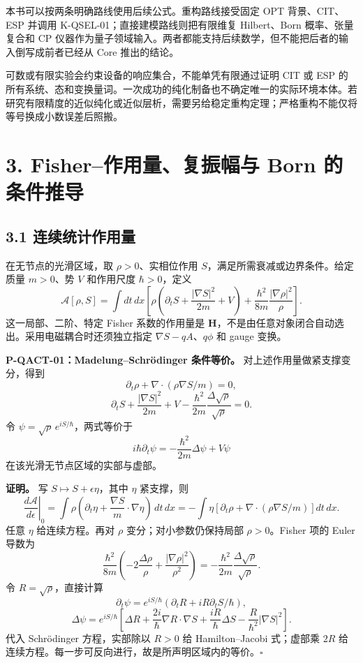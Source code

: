 \documentclass[
  11pt,
  oneside]{book}
\begin{document}
本书可以按两条明确路线使用后续公式。重构路线接受固定 OPT 背景、CIT、ESP
并调用 K-QSEL-01；直接建模路线则把有限维复 Hilbert、Born
概率、张量复合和 CP
仪器作为量子领域输入。两者都能支持后续数学，但不能把后者的输入倒写成前者已经从
Core 推出的结论。

可数或有限实验会约束设备的响应集合，不能单凭有限通过证明 CIT 或 ESP
的所有系统、态和变换量词。一次成功的纯化制备也不确定唯一的实际环境本体。若研究有限精度的近似纯化或近似层析，需要另给稳定重构定理；严格重构不能仅将等号换成小数误差后照搬。

\hypertarget{ch-3}{%
\chapter{3. Fisher--作用量、复振幅与 Born 的条件推导}\label{ch-3}}

\hypertarget{ux8fdeux7eedux7edfux8ba1ux4f5cux7528ux91cf}{%
\section{3.1
连续统计作用量}\label{ux8fdeux7eedux7edfux8ba1ux4f5cux7528ux91cf}}

在无节点的光滑区域，取 \(\rho>0\)、实相位作用
\(S\)，满足所需衰减或边界条件。给定质量 \(m>0\)、势 \(V\) 和作用尺度
\(\hbar>0\)，定义 \[
\mathcal A[\rho,S]=\int dt\,dx\left[
\rho\left(\partial_tS+\frac{|\nabla S|^2}{2m}+V\right)
+\frac{\hbar^2}{8m}\frac{|\nabla\rho|^2}{\rho}\right].
\] 这一局部、二阶、特定 Fisher 系数的作用量是
\textbf{H}，不是由任意对象闭合自动选出。采用电磁耦合时还须独立指定
\(\nabla S-qA\)、\(q\phi\) 和 gauge 变换。

\protect\hypertarget{p-qact-01}{}{}

\textbf{P-QACT-01：Madelung--Schrödinger 条件等价。}
对上述作用量做紧支撑变分，得到 \[
\partial_t\rho+\nabla\cdot(\rho\nabla S/m)=0,
\] \[
\partial_tS+\frac{|\nabla S|^2}{2m}+V
-\frac{\hbar^2}{2m}\frac{\Delta\sqrt\rho}{\sqrt\rho}=0.
\] 令 \(\psi=\sqrt\rho\,e^{iS/\hbar}\)，两式等价于 \[
i\hbar\partial_t\psi=
-\frac{\hbar^2}{2m}\Delta\psi+V\psi
\] 在该光滑无节点区域的实部与虚部。

\textbf{证明。} 写 \(S\mapsto S+\epsilon\eta\)，其中 \(\eta\) 紧支撑，则
\[
\left.\frac{d\mathcal A}{d\epsilon}\right|_0
=\int\rho\left(\partial_t\eta+\frac{\nabla S}{m}\cdot\nabla\eta\right)\,dt\,dx
=-\int\eta\left[\partial_t\rho+\nabla\cdot(\rho\nabla S/m)\right]dt\,dx.
\] 任意 \(\eta\) 给连续方程。再对 \(\rho\) 变分；对小参数仍保持局部
\(\rho>0\)。Fisher 项的 Euler 导数为 \[
\frac{\hbar^2}{8m}
\left(-2\frac{\Delta\rho}{\rho}
+\frac{|\nabla\rho|^2}{\rho^2}\right)
=-\frac{\hbar^2}{2m}\frac{\Delta\sqrt\rho}{\sqrt\rho}.
\] 令 \(R=\sqrt\rho\)，直接计算 \[
\partial_t\psi=e^{iS/\hbar}(\partial_tR+iR\partial_tS/\hbar),
\] \[
\Delta\psi=e^{iS/\hbar}\left[\Delta R+
\frac{2i}{\hbar}\nabla R\cdot\nabla S+
\frac{iR}{\hbar}\Delta S-\frac{R}{\hbar^2}|\nabla S|^2\right].
\] 代入 Schrödinger 方程，实部除以 \(R>0\) 给 Hamilton--Jacobi
式；虚部乘 \(2R\)
给连续方程。每一步可反向进行，故是所声明区域内的等价。\(\square\)
\end{document}
